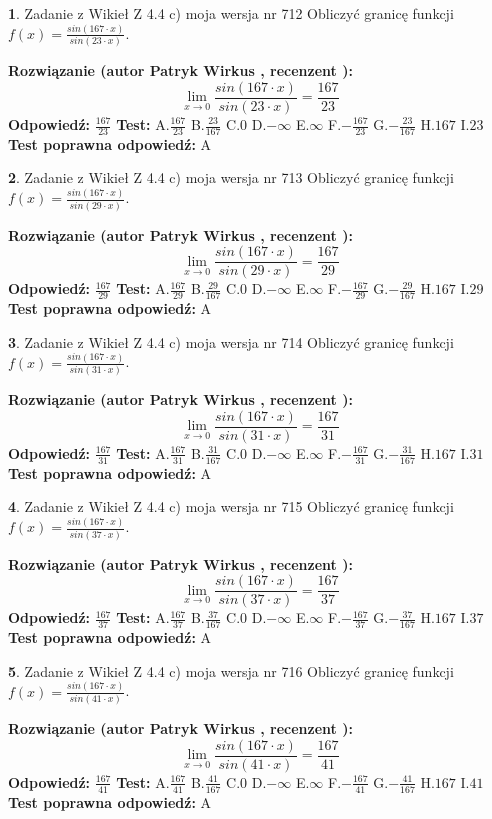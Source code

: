 \documentclass[12pt, a4paper]{article}
\theoremstyle{definition} %
\newtheorem{zad}{}
\newcommand{\zadStart}[1]{\begin{zad}#1\newline}
\newcommand{\zadStop}{\end{zad}}
\newcommand{\rozwStart}[2]{\noindent \textbf{Rozwiązanie (autor #1 , recenzent #2): }\newline}
\newcommand{\rozwStop}{\newline}
\newcommand{\odpStart}{\noindent \textbf{Odpowiedź:}\newline}
\newcommand{\odpStop}{\newline}
\newcommand{\testStart}{\noindent \textbf{Test:}\newline}
\newcommand{\testStop}{\newline}
\newcommand{\kluczStart}{\noindent \textbf{Test poprawna odpowiedź:}\newline}
\newcommand{\kluczStop}{\newline}
\begin{document}
\zadStart{Zadanie z Wikieł Z 4.4 c) moja wersja nr 712}
Obliczyć granicę funkcji $f(x)=\frac{sin(167\cdot x)}{sin(23\cdot x)}$.
\zadStop
\rozwStart{Patryk Wirkus}{}
$$\lim\limits_{x\to 0}\frac{sin(167\cdot x)}{sin(23\cdot x)}=
\frac{167}{23}$$
\rozwStop
\odpStart
$\frac{167}{23}$
\odpStop
\testStart
A.$\frac{167}{23}$
B.$\frac{23}{167}$
C.$0$
D.$-\infty$
E.$\infty$
F.$-\frac{167}{23}$
G.$-\frac{23}{167}$
H.$167$
I.$23$
\testStop
\kluczStart
A
\kluczStop



\zadStart{Zadanie z Wikieł Z 4.4 c) moja wersja nr 713}
Obliczyć granicę funkcji $f(x)=\frac{sin(167\cdot x)}{sin(29\cdot x)}$.
\zadStop
\rozwStart{Patryk Wirkus}{}
$$\lim\limits_{x\to 0}\frac{sin(167\cdot x)}{sin(29\cdot x)}=
\frac{167}{29}$$
\rozwStop
\odpStart
$\frac{167}{29}$
\odpStop
\testStart
A.$\frac{167}{29}$
B.$\frac{29}{167}$
C.$0$
D.$-\infty$
E.$\infty$
F.$-\frac{167}{29}$
G.$-\frac{29}{167}$
H.$167$
I.$29$
\testStop
\kluczStart
A
\kluczStop



\zadStart{Zadanie z Wikieł Z 4.4 c) moja wersja nr 714}
Obliczyć granicę funkcji $f(x)=\frac{sin(167\cdot x)}{sin(31\cdot x)}$.
\zadStop
\rozwStart{Patryk Wirkus}{}
$$\lim\limits_{x\to 0}\frac{sin(167\cdot x)}{sin(31\cdot x)}=
\frac{167}{31}$$
\rozwStop
\odpStart
$\frac{167}{31}$
\odpStop
\testStart
A.$\frac{167}{31}$
B.$\frac{31}{167}$
C.$0$
D.$-\infty$
E.$\infty$
F.$-\frac{167}{31}$
G.$-\frac{31}{167}$
H.$167$
I.$31$
\testStop
\kluczStart
A
\kluczStop



\zadStart{Zadanie z Wikieł Z 4.4 c) moja wersja nr 715}
Obliczyć granicę funkcji $f(x)=\frac{sin(167\cdot x)}{sin(37\cdot x)}$.
\zadStop
\rozwStart{Patryk Wirkus}{}
$$\lim\limits_{x\to 0}\frac{sin(167\cdot x)}{sin(37\cdot x)}=
\frac{167}{37}$$
\rozwStop
\odpStart
$\frac{167}{37}$
\odpStop
\testStart
A.$\frac{167}{37}$
B.$\frac{37}{167}$
C.$0$
D.$-\infty$
E.$\infty$
F.$-\frac{167}{37}$
G.$-\frac{37}{167}$
H.$167$
I.$37$
\testStop
\kluczStart
A
\kluczStop



\zadStart{Zadanie z Wikieł Z 4.4 c) moja wersja nr 716}
Obliczyć granicę funkcji $f(x)=\frac{sin(167\cdot x)}{sin(41\cdot x)}$.
\zadStop
\rozwStart{Patryk Wirkus}{}
$$\lim\limits_{x\to 0}\frac{sin(167\cdot x)}{sin(41\cdot x)}=
\frac{167}{41}$$
\rozwStop
\odpStart
$\frac{167}{41}$
\odpStop
\testStart
A.$\frac{167}{41}$
B.$\frac{41}{167}$
C.$0$
D.$-\infty$
E.$\infty$
F.$-\frac{167}{41}$
G.$-\frac{41}{167}$
H.$167$
I.$41$
\testStop
\kluczStart
A
\kluczStop
\end{document}
